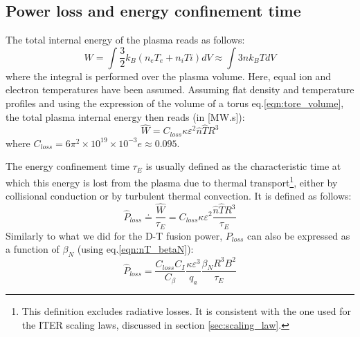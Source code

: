 \subsection{Power loss and energy confinement time}

The total internal energy of the plasma reads as follows:
\begin{equation*}
  W  = \int \frac{3}{2} k_B \left( n_e T_e + n_i Ti \right ) dV 
  \approx \int 3 n k_BT dV
\end{equation*}
where the integral is performed over the plasma volume. Here, equal ion and electron temperatures have been assumed. Assuming flat density and temperature profiles and using the expression of the volume of a torus eq.\ref{eqn:tore_volume}, the total plasma internal energy then reads (in [MW.s]):
\begin{equation}
  \hat W = C_{loss} \kappa \varepsilon^2  \hat n \hat T R^3
\label{eq:total_energy}
\end{equation}
where $C_{loss} = 6\pi^2 \times 10^{19} \times 10^{-3}e \approx 0.095$.

The energy confinement time $\tau_E$ is usually defined as the characteristic time at which this energy is lost from the plasma due to thermal transport\footnote{This definition excludes radiative losses. It is consistent with the one used for the ITER scaling laws, discussed in section \ref{sec:scaling_law}.}, either by collisional conduction or by turbulent thermal convection. It is defined as follows:
\begin{equation}
\boxed{
  \hat P_{loss} \doteq \frac{\hat W}{\tau_E} 
  = C_{loss} \kappa \varepsilon^2  \frac{\hat n \hat T R^3}{\tau_E}
}
\label{eq:Ploss}
\end{equation}
Similarly to what we did for the D-T fusion power, $P_{loss}$ can also be expressed as a function of $\beta_N$ (using eq.\ref{eqn:nT_betaN}):
\begin{equation}
  \hat P_{loss} = \frac{C_{loss}C_I}{C_\beta}  \frac{\kappa \varepsilon^3}{q_a}
    \frac{\beta_N R^3 B^2}{\tau_E}
\label{eq:Ploss_betaN}
\end{equation}


